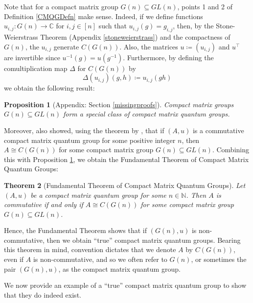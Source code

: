 \documentclass{article}
\theoremstyle{plain}
\newtheorem{theorem}{Theorem}[section]
\newtheorem{proposition}[theorem]{Proposition}
\theoremstyle{definition}
\theoremstyle{remark}
\begin{document}
Note that for a compact matrix group $G(n) \subseteq GL(n)$, points 1 and 2 of 
Definition \ref{CMQGDefn} make sense. 
Indeed, if we define functions
$u_{i,j} : G(n) \rightarrow \mathbb{C}$ for $i,j \in [n]$
such that $u_{i,j}(g) = g_{i,j}$, then,
by the Stone-Weierstrass Theorem (Appendix \ref{stoneweierstrass})
and the compactness of $G(n)$,
the $u_{i,j}$ generate $C(G(n))$.
Also, the matrices $u \coloneqq (u_{i,j})$ and $u^\top$ are invertible
since $u^{-1}(g) = u(g^{-1})$.
Furthermore, by defining the comultiplication map $\Delta$ for $C(G(n))$ by 
\begin{equation} \label{deltaCGndefn}
	\Delta(u_{i,j})(g,h) \coloneqq u_{i,j}(gh)
\end{equation}
we obtain the following result:
\begin{proposition}[Appendix: Section \ref{missingproofs}] \label{compmatgroup}
	Compact matrix groups $G(n) \subseteq GL(n)$ form a 
	special class of compact matrix quantum groups. 
\end{proposition}
Moreover, 
\citet[Theorem 1.5]{woronowicz1987} 
also showed, using the theorem by \citet{gelfand1943},
that if $(A, u)$ is a commutative compact matrix quantum group 
for some positive integer $n$,
then $A \cong C(G(n))$ for some compact matrix group $G(n) \subseteq GL(n)$.
Combining this with Proposition \ref{compmatgroup}, we obtain 
the Fundamental Theorem of Compact Matrix Quantum Groups: 
\begin{theorem} [Fundamental Theorem of Compact Matrix Quantum Groups]
	\label{cmqgfundamental}
	Let $(A, u)$ be a compact matrix quantum group for some $n \in \mathbb{N}$.
	Then $A$ is commutative if and only if $A \cong C(G(n))$ for some compact
	matrix group $G(n) \subseteq GL(n)$.
\end{theorem}

Hence, the Fundamental Theorem shows
	that if $(G(n), u)$ is non-commutative, 
	then we obtain ``true'' compact matrix quantum groups.
	Bearing this theorem in mind,
	convention dictates that we
	denote $A$ by $C(G(n))$, 
	even if $A$ is non-commutative,
	and so we often refer to $G(n)$, 
	or sometimes the pair $(G(n), u)$, as the compact matrix quantum group.

We now provide an example of a ``true'' compact matrix quantum group to show 
that they do indeed exist.
\end{document}
